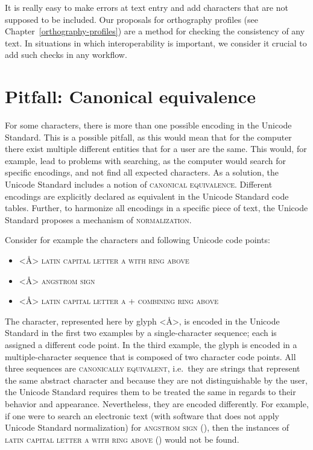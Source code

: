 It is really easy to make errors at text entry and add characters that are 
not supposed to be included. Our proposals for orthography profiles (see
Chapter~\ref{orthography-profiles}) are a method for checking the consistency of 
any text. In situations in which interoperability is important, we consider it 
crucial to add such checks in any workflow.

\section{Pitfall: Canonical equivalence}
\label{pitfall-canonical-equivalence}

For some characters, there is more than one possible encoding in the Unicode
Standard. This is a possible pitfall, as this would mean that for the computer
there exist multiple different entities that for a user are the same. This
would, for example, lead to problems with searching, as the computer would
search for specific encodings, and not find all expected characters. As a
solution, the Unicode Standard includes a notion of \textsc{canonical
equivalence}. Different encodings are explicitly declared as equivalent in the
Unicode Standard code tables. Further, to harmonize all encodings in a specific
piece of text, the Unicode Standard proposes a mechanism of
\textsc{normalization}.

Consider for example the characters and following Unicode code points:
\begin{itemize}
	\def\labelenumi{\arabic{enumi}.} 
	\item <Å> \textsc{latin capital letter a with ring above}  
	\item <Å> \textsc{angstrom sign} 
	\item <Å> \textsc{latin capital letter a} 
	+ \textsc{combining ring above} 
\end{itemize}

The character, represented here by glyph <Å>, is encoded in the Unicode Standard
in the first two examples by a single-character sequence; each is assigned a
different code point. In the third example, the glyph is encoded in a
multiple-character sequence that is composed of two character code points. All
three sequences are \textsc{canonically equivalent}, i.e.~they are strings that
represent the same abstract character and because they are not distinguishable
by the user, the Unicode Standard requires them to be treated the same in
regards to their behavior and appearance. Nevertheless, they are encoded
differently. For example, if one were to search an electronic text (with
software that does not apply Unicode Standard normalization) for
\textsc{angstrom sign} (), then the instances of \textsc{latin 
capital letter a with ring above} () would not be found.

